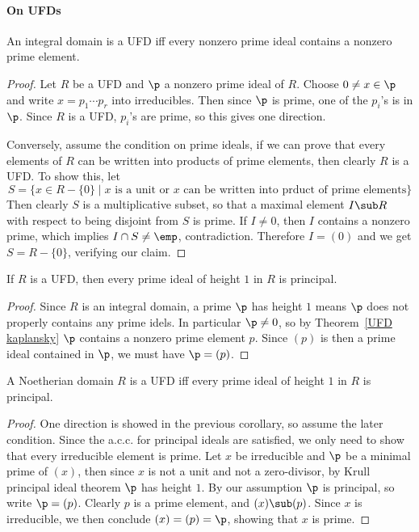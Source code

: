 \paragraph{On UFDs}
\begin{proposition}\label{UFD kaplansky}
An integral domain is a UFD iff every nonzero prime ideal contains a nonzero prime element.
\end{proposition}
\begin{proof}
Let $R$ be a UFD and $\p$ a nonzero prime ideal of $R$. Choose $0\neq x\in\p$ and write $x=p_1\cdots p_r$ into irreducibles. Then since $\p$ is prime, one of the $p_i$'s is in $\p$. Since $R$ is a UFD, $p_i$'s are prime, so this gives one direction.\par
Conversely, assume the condition on prime ideals, if we can prove that every elements of $R$ can be written into products of prime elements, then clearly $R$ is a UFD. To show this, let
\[S=\{x\in R-\{0\}\mid\text{$x$ is a unit or $x$ can be written into prduct of prime elements}\}\]
Then clearly $S$ is a multiplicative subset, so that a maximal element $I\sub R$ with respect to being disjoint from $S$ is prime. If $I\neq0$, then $I$ contains a nonzero prime, which implies $I\cap S\neq\emp$, contradiction. Therefore $I=(0)$ and we get $S=R-\{0\}$, verifying our claim.
\end{proof}
\begin{corollary}\label{UFD prime ideal height 1 is principal}
If $R$ is a UFD, then every prime ideal of height $1$ in $R$ is principal.
\end{corollary}
\begin{proof}
Since $R$ is an integral domain, a prime $\p$ has height $1$ means $\p$ does not properly contains any prime idels. In particular $\p\neq 0$, so by Theorem~\ref{UFD kaplansky} $\p$ contains a nonzero prime element $p$. Since $(p)$ is then a prime ideal contained in $\p$, we must have $\p=(p)$.
\end{proof}
\begin{proposition}
A Noetherian domain $R$ is a UFD iff every prime ideal of height $1$ in $R$ is principal.
\end{proposition}
\begin{proof}
One direction is showed in the previous corollary, so assume the later condition. Since the a.c.c. for principal ideals are satisfied, we only need to show that every irreducible element is prime. Let $x$ be irreducible and $\p$ be a minimal prime of $(x)$, then since $x$ is not a unit and not a zero-divisor, by Krull principal ideal theorem $\p$ has height $1$. By our assumption $\p$ is principal, so write $\p=(p)$. Clearly $p$ is a prime element, and $(x)\sub(p)$. Since $x$ is irreducible, we then conclude $(x)=(p)=\p$, showing that $x$ is prime.
\end{proof}
